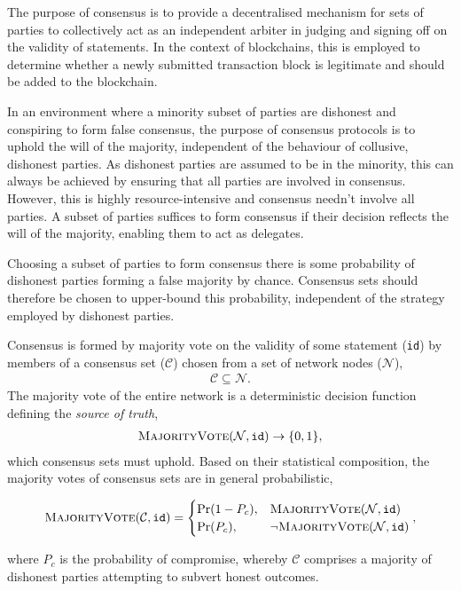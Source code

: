 The purpose of consensus is to provide a decentralised mechanism for sets of parties to collectively act as an independent arbiter in judging and signing off on the validity of statements. In the context of blockchains, this is employed to determine whether a newly submitted transaction block is legitimate and should be added to the blockchain.

In an environment where a minority subset of parties are dishonest and conspiring to form false consensus, the purpose of consensus protocols is to uphold the will of the majority, independent of the behaviour of collusive, dishonest parties. As dishonest parties are assumed to be in the minority, this can always be achieved by ensuring that all parties are involved in consensus. However, this is highly resource-intensive and consensus needn't involve all parties. A subset of parties suffices to form consensus if their decision reflects the will of the majority, enabling them to act as delegates.

Choosing a subset of parties to form consensus there is some probability of dishonest parties forming a false majority by chance. Consensus sets should therefore be chosen to upper-bound this probability, independent of the strategy employed by dishonest parties.

Consensus is formed by majority vote on the validity of some statement (\texttt{id}) by members of a consensus set ($\mathcal{C}$) chosen from a set of network nodes ($\mathcal{N}$),
\begin{align}
	\mathcal{C}\subseteq\mathcal{N}.
\end{align}
The majority vote of the entire network is a deterministic decision function defining the \emph{source of truth},
\begin{align} \label{eq:majority_vote_det}
	\textsc{MajorityVote}(\mathcal{N},\mathtt{id})\to\{0,1\},
\end{align}
which consensus sets must uphold. Based on their statistical composition, the majority votes of consensus sets are in general probabilistic,
\begin{widetext}
	\begin{align*}
		\textsc{MajorityVote}(\mathcal{C},\mathtt{id}) = \begin{cases}
		\mathrm{Pr}(1-P_c), & \textsc{MajorityVote}(\mathcal{N}, \mathtt{id}) \\
		\mathrm{Pr}(P_c),   & \neg \textsc{MajorityVote}(\mathcal{N}, \mathtt{id})
		\end{cases},
	\end{align*}
\end{widetext}
where $P_c$ is the probability of compromise, whereby $\mathcal{C}$ comprises a majority of dishonest parties attempting to subvert honest outcomes.

